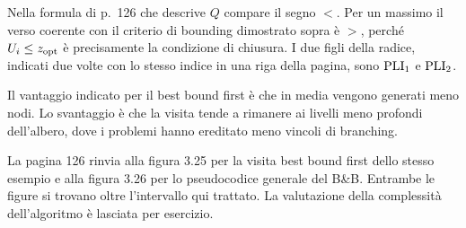 Nella formula di p.~126 che descrive $Q$ compare il segno $<$.
Per un massimo il verso coerente con il criterio di bounding dimostrato
sopra è $>$, perché $U_i\leq z_{\mathrm{opt}}$ è precisamente la condizione di
chiusura. I due figli della radice, indicati due volte con lo stesso indice
in una riga della pagina, sono $\mathrm{PLI}_{1}$ e $\mathrm{PLI}_{2}$.

Il vantaggio indicato per il best bound first è che in media vengono
generati meno nodi. Lo svantaggio è che la visita tende a rimanere ai
livelli meno profondi dell'albero, dove i problemi hanno ereditato meno
vincoli di branching.

La pagina 126 rinvia alla figura 3.25 per la visita best bound first
dello stesso esempio e alla figura 3.26 per lo pseudocodice generale
del B\&B. Entrambe le figure si trovano oltre l'intervallo qui trattato.
La valutazione della complessità dell'algoritmo è lasciata per esercizio.


